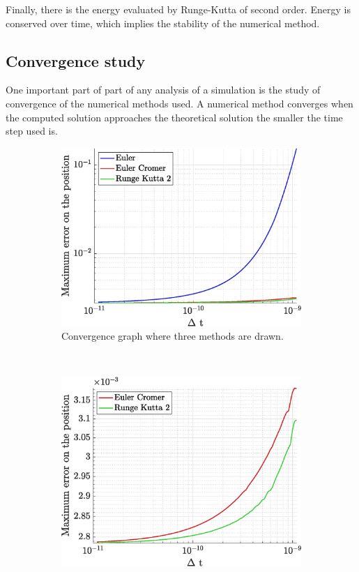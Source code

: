 \documentclass[a4paper,12pt,twoside]{article}
\begin{document}
Finally, there is the energy evaluated by Runge-Kutta of second order.
Energy is conserved over time, which implies the stability of the numerical method.\\



\subsection{Convergence study}\label{sec:etude-conv}
One important part of part of any analysis of a simulation is the study of convergence of the numerical methods used.
A numerical method converges when the computed solution approaches the theoretical solution the smaller the time step used is.\\

\begin{figure}[h]
\centering
\begin{subfigure}[t]{0.45\textwidth}
	\includegraphics[width=\textwidth]{graphs/ex2_ii_conv_ALL.eps}
	\caption{Convergence graph where three methods are drawn.}
	\label{fig:app1-conv-ALL}
\end{subfigure}
~
\begin{subfigure}[t]{0.45\textwidth}
	\includegraphics[width=\textwidth]{graphs/ex2_ii_conv_NoEuler.eps}

\end{subfigure}
\end{figure}
\end{document}
